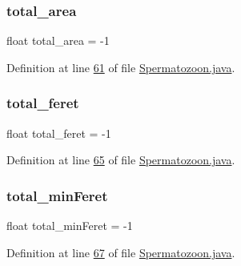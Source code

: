 \subsubsection{\texorpdfstring{total\+\_\+area}{total\_area}}
{\footnotesize\ttfamily float total\+\_\+area = -\/1}



Definition at line \hyperlink{_spermatozoon_8java_source_l00061}{61} of file \hyperlink{_spermatozoon_8java_source}{Spermatozoon.\+java}.

\hypertarget{classdata_1_1_spermatozoon_ab5ab64dc3696466f1e700d20d538e436}{}\label{classdata_1_1_spermatozoon_ab5ab64dc3696466f1e700d20d538e436} 
\subsubsection{\texorpdfstring{total\+\_\+feret}{total\_feret}}
{\footnotesize\ttfamily float total\+\_\+feret = -\/1}



Definition at line \hyperlink{_spermatozoon_8java_source_l00065}{65} of file \hyperlink{_spermatozoon_8java_source}{Spermatozoon.\+java}.

\hypertarget{classdata_1_1_spermatozoon_aea69b99de4cd3bda1fc7c464bb5d842e}{}\label{classdata_1_1_spermatozoon_aea69b99de4cd3bda1fc7c464bb5d842e} 
\subsubsection{\texorpdfstring{total\+\_\+min\+Feret}{total\_minFeret}}
{\footnotesize\ttfamily float total\+\_\+min\+Feret = -\/1}



Definition at line \hyperlink{_spermatozoon_8java_source_l00067}{67} of file \hyperlink{_spermatozoon_8java_source}{Spermatozoon.\+java}.

\hypertarget{classdata_1_1_spermatozoon_a893cd9ee5a9bdc16eecb9891fadd602c}{}\label{classdata_1_1_spermatozoon_a893cd9ee5a9bdc16eecb9891fadd602c} 
